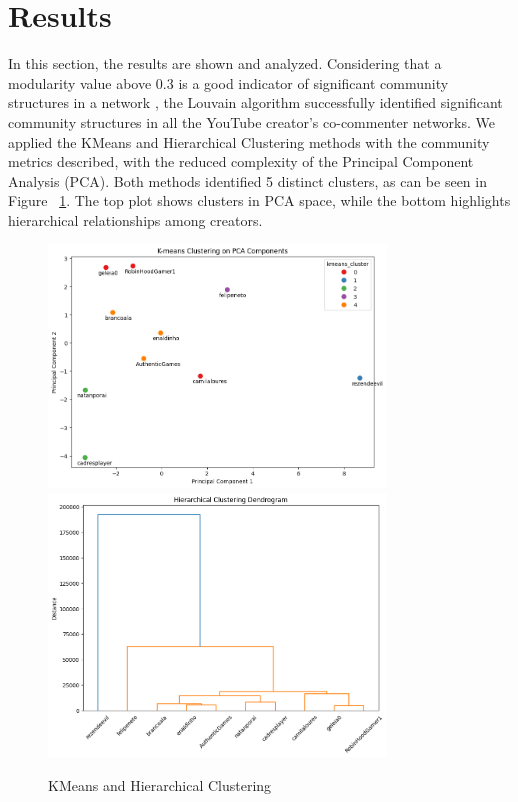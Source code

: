 \documentclass[12pt]{article}
\begin{document}
\section{Results}

In this section, the results are shown and analyzed. 
Considering that a modularity value above 0.3 is a good indicator of significant
community structures in a network \cite{PhysRevE.70.066111}, the Louvain algorithm successfully 
identified significant community structures in all the YouTube creator's co-commenter networks.
We applied the KMeans and Hierarchical Clustering methods with the community metrics described, 
with the reduced complexity of the Principal Component Analysis (PCA). 
Both methods identified 5 distinct clusters, as can be seen in Figure ~\ref{fig:kmeans_hierarchical}.
The top plot shows clusters in PCA space, while the bottom highlights hierarchical 
relationships among creators.

\begin{figure}[hbt!]
    \centering
    \includegraphics[width=0.8\textwidth]{./imgs/KMeans_PCA.png}
    \vspace{0.5cm} %
    \includegraphics[width=0.8\textwidth]{./imgs/Hierarchical_clustering.png}
    \caption{KMeans and Hierarchical Clustering}
    \label{fig:kmeans_hierarchical}
\end{figure}
\end{document}
